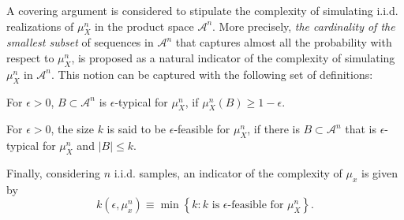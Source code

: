 A covering argument is considered to stipulate the complexity of simulating i.i.d. realizations of $\mu_X^n$
in the product space $\mathcal{A}^n$. More precisely, {\em the cardinality of the smallest subset} 
of sequences in $\mathcal{A}^n$ that captures almost all the probability with respect to $\mu_X^n$, is proposed as a natural indicator 
of the complexity of  simulating $\mu_X^n$ in $\mathcal{A}^n$. This notion can be captured with the following 
set of definitions: 
\begin{definition}
	For $\epsilon>0$, $B\subset \mathcal{A}^n$ is $\epsilon$-typical for $\mu^n_X$,  if $\mu^n_X(B) \geq 1 - \epsilon$.  
\end{definition}
\begin{definition}
	For $\epsilon>0$, the size $k$ is said to be $\epsilon$-feasible for $\mu^n_X$, if there is $B\subset \mathcal{A}^n$ that is $\epsilon$-typical for $\mu^n_X$ and $\left| B\right| \leq k$.
\end{definition}
\begin{definition} \label{operational_comple_simulation1_PI}
Finally, considering $n$ i.i.d. samples, an indicator of the complexity of $\mu_x$ is given by
\begin{equation}\label{eq_sec_pre_5_PI}
	k(\epsilon, \mu^n_x)  \equiv \min  \left\{k: \text{$k$ is $\epsilon$-feasible for $\mu^n_X$}  \right\}.
\end{equation}
\end{definition}

